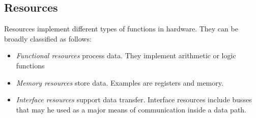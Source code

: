 \subsection{Resources}
Resources implement different types of functions in hardware. They can be broadly classified as follows:
\begin{itemize}
\item \textit{Functional resources}  process data. They implement arithmetic or logic functions
\item \textit{Memory resources}  store data. Examples are registers and memory.
\item \textit{Interface resources}  support data transfer. Interface resources include busses that may he used as a major means  of  communication inside a data path.
\end{itemize}